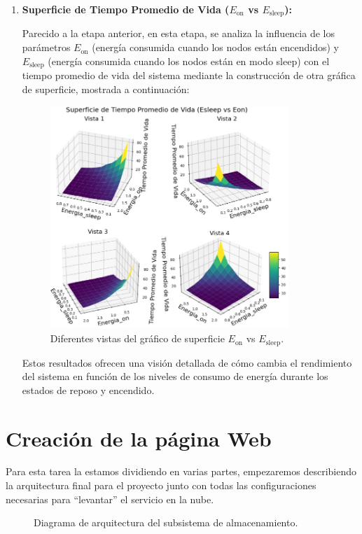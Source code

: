 \begin{enumerate}[label=\arabic*.]
\item \textbf{Superficie de Tiempo Promedio de Vida ($E_{\text{on}}$ vs $E_{\text{sleep}}$):}

Parecido a la etapa anterior, en esta etapa, se analiza la influencia de los parámetros $E_{\text{on}}$ (energía consumida cuando los nodos están encendidos) y $E_{\text{sleep}}$ (energía consumida cuando los nodos están en modo sleep) con el tiempo promedio de vida del sistema mediante la construcción de otra gráfica de superficie, mostrada a continuación:

\begin{figure}[H]
    \centering
    \includegraphics[width=0.85\textwidth]{imagenes/mmpp7.1.jpg}
    \caption{Diferentes vistas del gráfico de superficie $E_{\text{on}}$ vs $E_{\text{sleep}}$.}
\end{figure}

Estos resultados ofrecen una visión detallada de cómo cambia el rendimiento del sistema en función de los niveles de consumo de energía durante los estados de reposo y encendido.

\end{enumerate}
\newpage


\section{Creación de la página Web}
Para esta tarea la estamos dividiendo en varias partes, empezaremos describiendo la arquitectura final para el proyecto junto con todas las configuraciones necesarias para “levantar” el servicio en la nube.
\begin{figure}[H]
    \centering
    \caption{Diagrama de arquitectura del subsistema de almacenamiento.}
    \label{diagrama-almacenamiento}
\end{figure}

